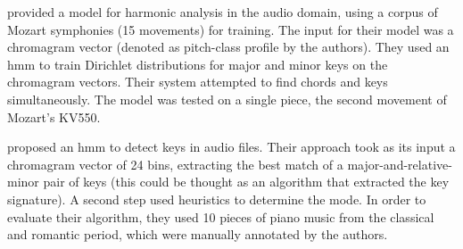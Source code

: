 \textcite{burgoyne2005learning} provided a model for
harmonic analysis in the audio domain, using a corpus of
Mozart symphonies (15 movements) for training. The input for
their model was a chromagram vector (denoted as pitch-class
profile by the authors). They used an \acrshort{hmm} to
train Dirichlet distributions for major and minor keys on
the chromagram vectors. Their system attempted to find
chords and keys simultaneously. The model was tested on a
single piece, the second movement of Mozart's KV550.

\textcite{chai2005detection} proposed an \acrshort{hmm} to
detect keys in audio files. Their approach took as its input
a chromagram vector of 24 bins, extracting the best match of
a major-and-relative-minor pair of keys (this could be
thought as an algorithm that extracted the key signature). A
second step used heuristics to determine the mode. In order
to evaluate their algorithm, they used 10 pieces of piano
music from the classical and romantic period, which were
manually annotated by the authors.



